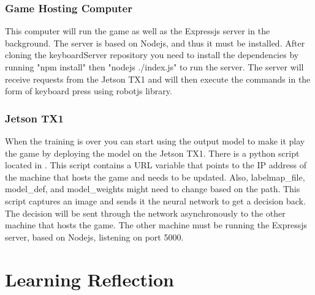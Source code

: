 \documentclass[onecolumn, draftclsnofoot,10pt, compsoc]{IEEEtran}
\begin{document}
\subsubsection{Game Hosting Computer}

This computer will run the game as well as the Expressjs server in the background.
The server is based on Nodejs, and thus it must be installed.
After cloning the keyboardServer repository you need to install the dependencies by running "npm install" then "nodejs ./index.js" to run the server.
The server will receive requests from the Jetson TX1 and will then execute the commands in the form of keyboard press using robot\-js library.

\subsubsection{Jetson TX1}

When the training is over you can start using the output model to make it play the game by deploying the model on the Jetson TX1.
There is a python script located in .
This script contains a URL variable that points to the IP address of the machine that hosts the game and needs to be updated.
Also, labelmap\_file, model\_def, and model\_weights might need to change based on the path. 
This script captures an image and sends it the neural network to get a decision back.
The decision will be sent through the network asynchronously to the other machine that hosts the game.
The other machine must be running the Expressjs server, based on Nodejs, listening on port 5000.

\section{Learning Reflection}
\end{document}
